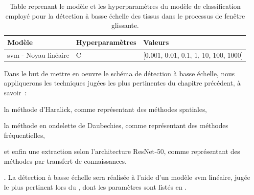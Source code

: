 \begin{table}[H]
    \centering
    \begin{tabular}{lll}
        \toprule
        \textbf{Modèle}                                 & \textbf{Hyperparamètres}  & \textbf{Valeurs}                          \\ \midrule
        \gls{svm} - Noyau linéaire                      & C                         & [0.001, 0.01, 0.1, 1, 10, 100, 1000]      \\ 
        \bottomrule 
    \end{tabular} 
    \caption{Table reprenant le modèle et les hyperparamètres du modèle de classification employé pour la détection à basse échelle des tissus dans le processus de fenêtre glissante.}
    \label{tab:parameters_image_improvement_sliding_window_models}
\end{table}\par

Dans le but de mettre en oeuvre le schéma de détection à basse échelle, nous appliquerons les techniques jugées les plus pertinentes du chapitre précédent, à savoir~: 
\begin{inlinerate}
    \item la méthode d'Haralick, comme représentant des méthodes spatiales,
    \item la méthode en ondelette de Daubechies, comme représentant des méthodes fréquentielles,
    \item et enfin une extraction selon l'architecture ResNet-50, comme représentant des méthodes par transfert de connaissances.
\end{inlinerate}. La détection à basse échelle sera réalisée à l'aide d'un modèle \gls{svm} linéaire, jugée le plus pertinent lors du , dont les paramètres sont listés en .\par

